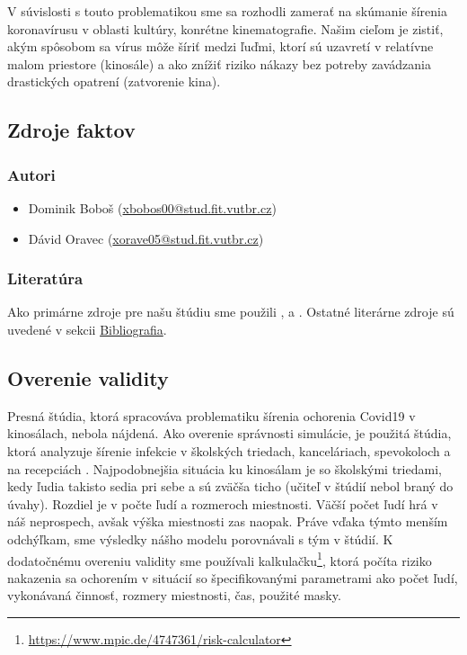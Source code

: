 \documentclass[a4paper, 11pt]{article}
\begin{document}
    \par V súvislosti s touto problematikou sme sa rozhodli zamerať na skúmanie šírenia koronavírusu v oblasti kultúry, konrétne kinematografie. Našim cieľom je zistiť, akým spôsobom sa vírus môže šíriť medzi ľuďmi, ktorí sú uzavretí v relatívne malom priestore (kinosále) a ako znížiť riziko nákazy bez potreby zavádzania drastických opatrení (zatvorenie kina).
    
        \subsection{Zdroje faktov}
            \subsubsection{Autori}
            \begin{itemize}
                \item Dominik Boboš (\href{mailto:xbobos00@stud.fit.vutbr.cz}{xbobos00@stud.fit.vutbr.cz})
                \item Dávid Oravec (\href{mailto:xorave05@stud.fit.vutbr.cz}{xorave05@stud.fit.vutbr.cz})
            \end{itemize}
            
            \subsubsection{Literatúra}
            Ako primárne zdroje pre našu štúdiu sme použili \cite{maxbrenner2020}, \cite{charlesconnor2020} a \cite{joslelieveldfrankhelleiset.al.2020}. Ostatné literárne zdroje sú uvedené v sekcii \hyperref[sec:bib]{Bibliografia}.
        
        \subsection{Overenie validity}
        Presná štúdia, ktorá spracováva problematiku šírenia ochorenia Covid19 v kinosálach, nebola nájdená. Ako overenie správnosti simulácie, je použitá štúdia, ktorá analyzuje šírenie infekcie v školských triedach, kanceláriach, spevokoloch a na recepciách \cite{joslelieveldfrankhelleiset.al.2020}. Najpodobnejšia situácia ku kinosálam je so školskými triedami, kedy ľudia takisto sedia pri sebe a sú zväčša ticho (učiteľ v štúdií nebol braný do úvahy). Rozdiel je v počte ľudí a rozmeroch miestnosti. Väčší počet ľudí hrá v náš neprospech, avšak výška miestnosti zas naopak. Práve vďaka týmto menším odchýľkam, sme výsledky nášho modelu porovnávali s tým v štúdií. K dodatočnému overeniu validity sme používali kalkulačku\footnote{\href{https://www.mpic.de/4747361/risk-calculator}{https://www.mpic.de/4747361/risk-calculator}}, ktorá počíta riziko nakazenia sa ochorením v situácií so špecifikovanými parametrami ako počet ľudí, vykonávaná činnosť, rozmery miestnosti, čas, použité masky.
        
\end{document}

